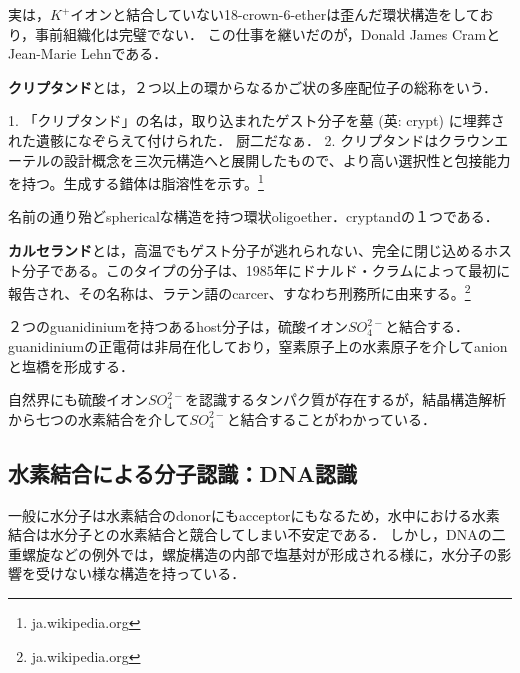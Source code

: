 \documentclass[uplatex, dvipdfmx]{jsreport}
\begin{document}
実は，$K^+$イオンと結合していない18-crown-6-etherは歪んだ環状構造をしており，事前組織化は完璧でない．
この仕事を継いだのが，Donald James CramとJean-Marie Lehnである．
\begin{example}
    \begin{definition}[cryptand]
        \textbf{クリプタンド}とは，２つ以上の環からなるかご状の多座配位子の総称をいう．
    \end{definition}
    \begin{remark}
        1. 「クリプタンド」の名は，取り込まれたゲスト分子を墓 (英: crypt) に埋葬された遺骸になぞらえて付けられた．
        厨二だなぁ．
        2. クリプタンドはクラウンエーテルの設計概念を三次元構造へと展開したもので、より高い選択性と包接能力を持つ。生成する錯体は脂溶性を示す。\footnote{ja.wikipedia.org}
    \end{remark}
\end{example}
\begin{definition}[spherand]
    名前の通り殆どsphericalな構造を持つ環状oligoether．cryptandの１つである．
\end{definition}
\begin{example}
    \begin{definition}[carcerand]
        \textbf{カルセランド}とは，高温でもゲスト分子が逃れられない、完全に閉じ込めるホスト分子である。このタイプの分子は、1985年にドナルド・クラムによって最初に報告され、その名称は、ラテン語のcarcer、すなわち刑務所に由来する。\footnote{ja.wikipedia.org}
    \end{definition}
\end{example}

\begin{example}[塩橋形成]
    ２つのguanidiniumを持つあるhost分子は，硫酸イオン$SO^{2-}_4$と結合する．
    guanidiniumの正電荷は非局在化しており，窒素原子上の水素原子を介してanionと塩橋を形成する．

    自然界にも硫酸イオン$SO^{2-}_4$を認識するタンパク質が存在するが，結晶構造解析から七つの水素結合を介して$SO^{2-}_4$と結合することがわかっている．
\end{example}

\subsection{水素結合による分子認識：DNA認識}
一般に水分子は水素結合のdonorにもacceptorにもなるため，水中における水素結合は水分子との水素結合と競合してしまい不安定である．
しかし，DNAの二重螺旋などの例外では，螺旋構造の内部で塩基対が形成される様に，水分子の影響を受けない様な構造を持っている．
\end{document}

